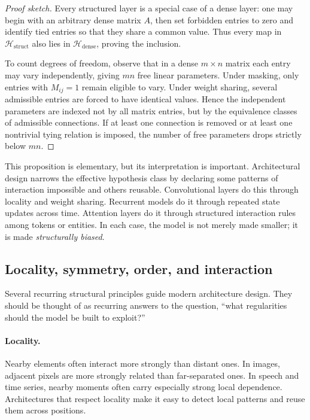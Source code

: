 \begin{proof}[Proof sketch]
Every structured layer is a special case of a dense layer: one may begin with an arbitrary dense matrix $A$, then set forbidden entries to zero and identify tied entries so that they share a common value.
Thus every map in $\mathcal{H}_{\mathrm{struct}}$ also lies in $\mathcal{H}_{\mathrm{dense}}$, proving the inclusion.

\medskip

To count degrees of freedom, observe that in a dense $m \times n$ matrix each entry may vary independently, giving $mn$ free linear parameters.
Under masking, only entries with $M_{ij}=1$ remain eligible to vary.
Under weight sharing, several admissible entries are forced to have identical values.
Hence the independent parameters are indexed not by all matrix entries, but by the equivalence classes of admissible connections.
If at least one connection is removed or at least one nontrivial tying relation is imposed, the number of free parameters drops strictly below $mn$.
\end{proof}

\medskip

This proposition is elementary, but its interpretation is important.
Architectural design narrows the effective hypothesis class by declaring some patterns of interaction impossible and others reusable.
Convolutional layers do this through locality and weight sharing.
Recurrent models do it through repeated state updates across time.
Attention layers do it through structured interaction rules among tokens or entities.
In each case, the model is not merely made smaller; it is made \emph{structurally biased}.

\subsection*{Locality, symmetry, order, and interaction}

Several recurring structural principles guide modern architecture design.
They should be thought of as recurring answers to the question, ``what regularities should the model be built to exploit?''

\paragraph{Locality.}
Nearby elements often interact more strongly than distant ones.
In images, adjacent pixels are more strongly related than far-separated ones.
In speech and time series, nearby moments often carry especially strong local dependence.
Architectures that respect locality make it easy to detect local patterns and reuse them across positions.

